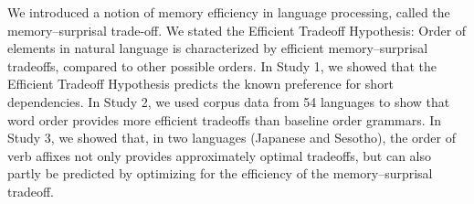 \documentclass[11pt,letterpaper]{article}
\begin{document}
We introduced a notion of memory efficiency in language processing, called the memory--surprisal trade-off.
We stated the Efficient Tradeoff Hypothesis: Order of elements in natural language is characterized by efficient memory--surprisal tradeoffs, compared to other possible orders.
In Study 1, we showed that the Efficient Tradeoff Hypothesis predicts the known preference for short dependencies.
In Study 2, we used corpus data from 54 languages to show that word order provides more efficient tradeoffs than baseline order grammars.
In Study 3, we showed that, in two languages (Japanese and Sesotho), the order of verb affixes not only provides approximately optimal tradeoffs, but can also partly be predicted by optimizing for the efficiency of the memory--surprisal tradeoff.





\end{document}

